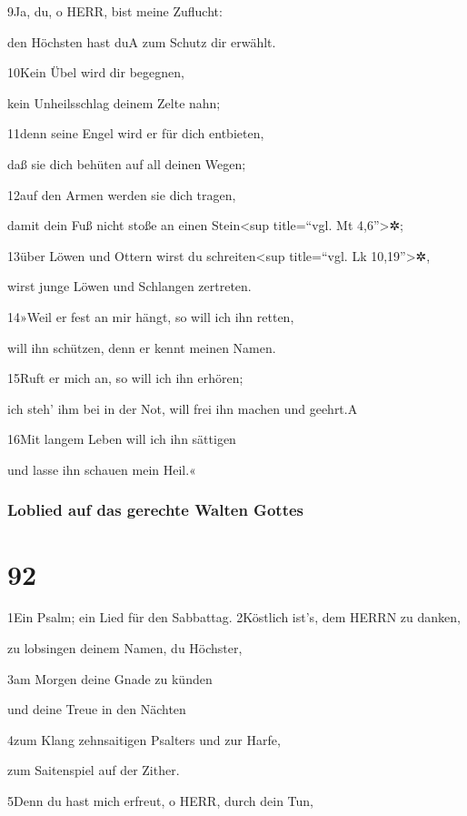 9Ja, du, o HERR, bist meine Zuflucht:

den Höchsten hast du{A} zum Schutz dir erwählt.

10Kein Übel wird dir begegnen,

kein Unheilsschlag deinem Zelte nahn;

11denn seine Engel wird er für dich entbieten,

daß sie dich behüten auf all deinen Wegen;

12auf den Armen werden sie dich tragen,

damit dein Fuß nicht stoße an einen Stein\textless sup title=``vgl. Mt
4,6''\textgreater✲;

13über Löwen und Ottern wirst du schreiten\textless sup title=``vgl. Lk
10,19''\textgreater✲,

wirst junge Löwen und Schlangen zertreten.

14»Weil er fest an mir hängt, so will ich ihn retten,

will ihn schützen, denn er kennt meinen Namen.

15Ruft er mich an, so will ich ihn erhören;

ich steh' ihm bei in der Not, will frei ihn machen und geehrt.{A}

16Mit langem Leben will ich ihn sättigen

und lasse ihn schauen mein Heil.«

\hypertarget{loblied-auf-das-gerechte-walten-gottes}{%
\subsubsection{Loblied auf das gerechte Walten
Gottes}\label{loblied-auf-das-gerechte-walten-gottes}}

\hypertarget{section-91}{%
\section{92}\label{section-91}}

1Ein Psalm; ein Lied für den Sabbattag. 2Köstlich ist's, dem HERRN zu
danken,

zu lobsingen deinem Namen, du Höchster,

3am Morgen deine Gnade zu künden

und deine Treue in den Nächten

4zum Klang zehnsaitigen Psalters und zur Harfe,

zum Saitenspiel auf der Zither.

5Denn du hast mich erfreut, o HERR, durch dein Tun,

